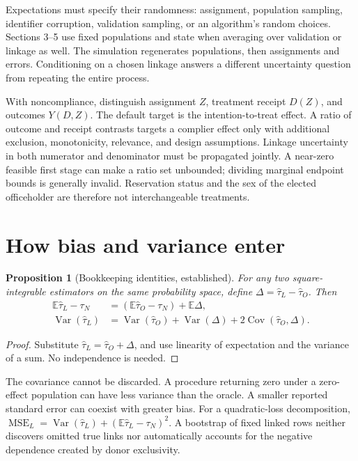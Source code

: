 \documentclass[11pt]{article}
\newtheorem{proposition}{Proposition}
\newcommand{\E}{\mathbb E}
\newcommand{\V}{\operatorname{Var}}
\newcommand{\Cov}{\operatorname{Cov}}
\begin{document}
Expectations must specify their randomness: assignment, population sampling, identifier
corruption, validation sampling, or an algorithm's random choices. Sections 3--5 use
fixed populations and state when averaging over validation or linkage as well. The
simulation regenerates populations, then assignments and errors. Conditioning on a
chosen linkage answers a different uncertainty question from repeating the entire
process.

With noncompliance, distinguish assignment $Z$, treatment receipt $D(Z)$, and outcomes
$Y(D,Z)$. The default target is the intention-to-treat effect. A ratio of outcome and
receipt contrasts targets a complier effect only with additional exclusion, monotonicity,
relevance, and design assumptions. Linkage uncertainty in both numerator and denominator
must be propagated jointly. A near-zero feasible first stage can make a ratio set
unbounded; dividing marginal endpoint bounds is generally invalid. Reservation status
and the sex of the elected officeholder are therefore not interchangeable treatments.

\section{How bias and variance enter}
\begin{proposition}[Bookkeeping identities, established]
For any two square-integrable estimators on the same probability space, define
$\Delta=\widehat\tau_L-\widehat\tau_O$. Then
\begin{align*}
 \E\widehat\tau_L-\tau_N&=(\E\widehat\tau_O-\tau_N)+\E\Delta,\\
 \V(\widehat\tau_L)&=\V(\widehat\tau_O)+\V(\Delta)+2\Cov(\widehat\tau_O,\Delta).
\end{align*}
\end{proposition}
\begin{proof}
Substitute $\widehat\tau_L=\widehat\tau_O+\Delta$, and use linearity of expectation
and the variance of a sum. No independence is needed.
\end{proof}
The covariance cannot be discarded. A procedure returning zero under a zero-effect
population can have less variance than the oracle. A smaller reported standard error
can coexist with greater bias. For a quadratic-loss decomposition,
$\operatorname{MSE}_L=\V(\widehat\tau_L)+(\E\widehat\tau_L-\tau_N)^2$.
A bootstrap of fixed linked rows neither discovers omitted true links nor automatically
accounts for the negative dependence created by donor exclusivity.
\end{document}
